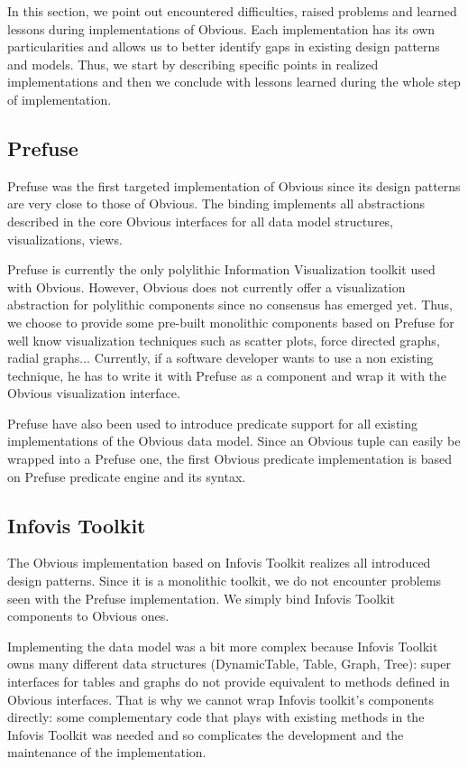 In this section, we point out encountered difficulties, raised problems and learned lessons during implementations of Obvious. Each implementation has its own particularities and allows us to better identify gaps in existing design patterns and models. Thus, we start by describing specific points in realized implementations and then we conclude with lessons learned during the whole step of implementation.

\subsection{Prefuse}

Prefuse was the first targeted implementation of Obvious since its design patterns are very close to those of Obvious.  The binding implements all abstractions described in the core Obvious interfaces for all data model structures, visualizations, views.

Prefuse is currently the only polylithic Information Visualization toolkit used with Obvious. However, Obvious does not currently offer a visualization abstraction for polylithic components since no consensus has emerged yet. Thus, we choose to provide some pre-built monolithic components based on Prefuse for well know visualization techniques such as scatter plots, force directed graphs, radial graphs... Currently, if a software developer wants to use a non existing technique, he has to write it with Prefuse as a component and wrap it with the Obvious visualization interface.

Prefuse have also been used to introduce predicate support for all existing implementations of the Obvious data model. Since an Obvious tuple can easily be wrapped into a Prefuse one, the first Obvious predicate implementation is based on Prefuse predicate engine and its syntax.

\subsection{Infovis Toolkit}

The Obvious implementation based on Infovis Toolkit realizes all introduced design patterns. Since it is a monolithic toolkit, we do not encounter problems seen with the Prefuse implementation. We simply bind Infovis Toolkit components to Obvious ones.

Implementing the data model was a bit more complex because Infovis Toolkit owns many different data structures (DynamicTable, Table, Graph, Tree): super interfaces for tables and graphs do not provide equivalent to methods defined in Obvious interfaces. That is why we cannot wrap Infovis toolkit's components directly: some complementary code that plays with existing methods in the Infovis Toolkit was needed and so complicates the development and the maintenance of the implementation.

